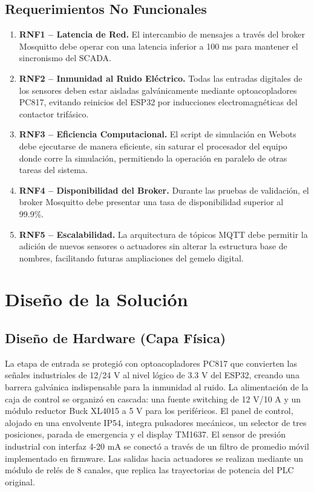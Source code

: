 \subsection{Requerimientos No Funcionales}

\begin{enumerate}
    \item \textbf{RNF1 – Latencia de Red.} El intercambio de mensajes a través del broker Mosquitto debe operar con una latencia inferior a 100 ms para mantener el sincronismo del SCADA.
    \item \textbf{RNF2 – Inmunidad al Ruido Eléctrico.} Todas las entradas digitales de los sensores deben estar aisladas galvánicamente mediante optoacopladores PC817, evitando reinicios del ESP32 por inducciones electromagnéticas del contactor trifásico.
    \item \textbf{RNF3 – Eficiencia Computacional.} El script de simulación en Webots debe ejecutarse de manera eficiente, sin saturar el procesador del equipo donde corre la simulación, permitiendo la operación en paralelo de otras tareas del sistema.
    \item \textbf{RNF4 – Disponibilidad del Broker.} Durante las pruebas de validación, el broker Mosquitto debe presentar una tasa de disponibilidad superior al 99.9\%.
    \item \textbf{RNF5 – Escalabilidad.} La arquitectura de tópicos MQTT debe permitir la adición de nuevos sensores o actuadores sin alterar la estructura base de nombres, facilitando futuras ampliaciones del gemelo digital.
\end{enumerate}

\section{Diseño de la Solución}
\label{sec:diseno_solucion}

\subsection{Diseño de Hardware (Capa Física)}

La etapa de entrada se protegió con optoacopladores PC817 que convierten las señales industriales de 12/24 V al nivel lógico de 3.3 V del ESP32, creando una barrera galvánica indispensable para la inmunidad al ruido. La alimentación de la caja de control se organizó en cascada: una fuente switching de 12 V/10 A y un módulo reductor Buck XL4015 a 5 V para los periféricos. El panel de control, alojado en una envolvente IP54, integra pulsadores mecánicos, un selector de tres posiciones, parada de emergencia y el display TM1637. El sensor de presión industrial con interfaz 4-20 mA se conectó a través de un filtro de promedio móvil implementado en firmware. Las salidas hacia actuadores se realizan mediante un módulo de relés de 8 canales, que replica las trayectorias de potencia del PLC original.

